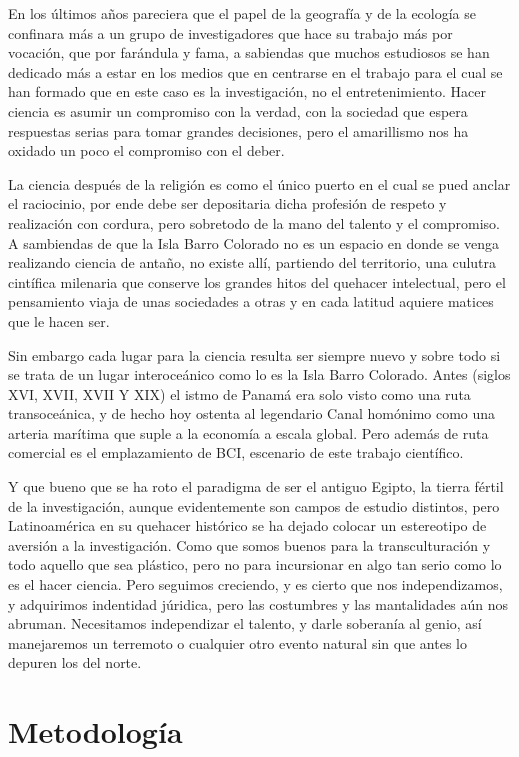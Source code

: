 \documentclass[11pt,]{article}
\begin{document}
En los últimos años pareciera que el papel de la geografía y de la
ecología se confinara más a un grupo de investigadores que hace su
trabajo más por vocación, que por farándula y fama, a sabiendas que
muchos estudiosos se han dedicado más a estar en los medios que en
centrarse en el trabajo para el cual se han formado que en este caso es
la investigación, no el entretenimiento. Hacer ciencia es asumir un
compromiso con la verdad, con la sociedad que espera respuestas serias
para tomar grandes decisiones, pero el amarillismo nos ha oxidado un
poco el compromiso con el deber.

La ciencia después de la religión es como el único puerto en el cual se
pued anclar el raciocinio, por ende debe ser depositaria dicha profesión
de respeto y realización con cordura, pero sobretodo de la mano del
talento y el compromiso. A sambiendas de que la Isla Barro Colorado no
es un espacio en donde se venga realizando ciencia de antaño, no existe
allí, partiendo del territorio, una culutra cintífica milenaria que
conserve los grandes hitos del quehacer intelectual, pero el pensamiento
viaja de unas sociedades a otras y en cada latitud aquiere matices que
le hacen ser.

Sin embargo cada lugar para la ciencia resulta ser siempre nuevo y sobre
todo si se trata de un lugar interoceánico como lo es la Isla Barro
Colorado. Antes (siglos XVI, XVII, XVII Y XIX) el istmo de Panamá era
solo visto como una ruta transoceánica, y de hecho hoy ostenta al
legendario Canal homónimo como una arteria marítima que suple a la
economía a escala global. Pero además de ruta comercial es el
emplazamiento de BCI, escenario de este trabajo científico.

Y que bueno que se ha roto el paradigma de ser el antiguo Egipto, la
tierra fértil de la investigación, aunque evidentemente son campos de
estudio distintos, pero Latinoamérica en su quehacer histórico se ha
dejado colocar un estereotipo de aversión a la investigación. Como que
somos buenos para la transculturación y todo aquello que sea plástico,
pero no para incursionar en algo tan serio como lo es el hacer ciencia.
Pero seguimos creciendo, y es cierto que nos independizamos, y
adquirimos indentidad júridica, pero las costumbres y las mantalidades
aún nos abruman. Necesitamos independizar el talento, y darle soberanía
al genio, así manejaremos un terremoto o cualquier otro evento natural
sin que antes lo depuren los del norte.

\section{Metodología}\label{metodologuxeda}
\end{document}
